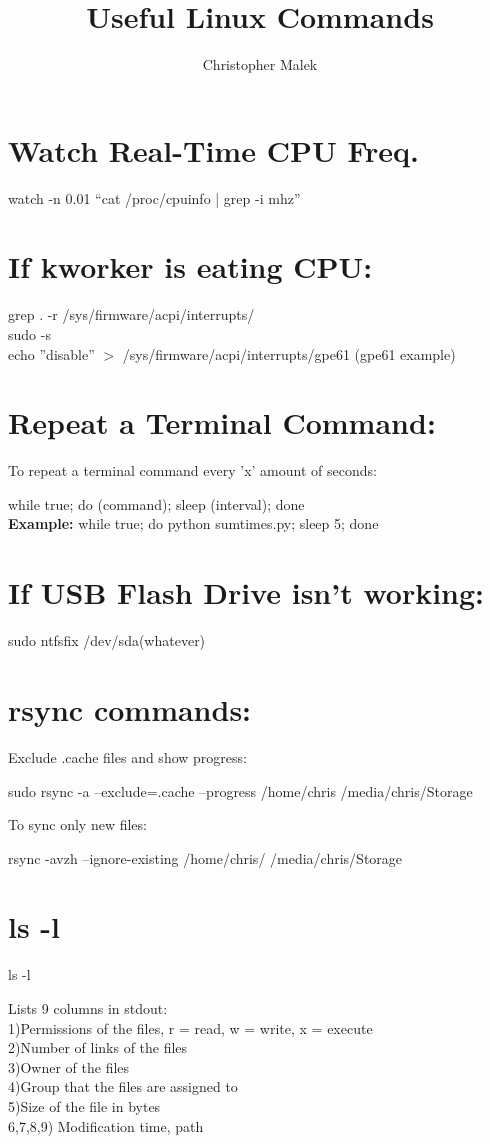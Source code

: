 \documentclass[10pt]{article}
\title{Useful Linux Commands}
\author{Christopher Malek}
\date{}
\newcommand{\bt}{\begin{tcolorbox}}
\newcommand{\et}{\end{tcolorbox}}
\begin{document}
\maketitle
\section{Watch Real-Time CPU Freq.}
\bt
watch -n 0.01 ``cat /proc/cpuinfo | grep -i mhz''
\et

\section{If kworker is eating CPU:}
\bt
grep . -r /sys/firmware/acpi/interrupts/\\
sudo -s\\
echo ''disable'' $>$ /sys/firmware/acpi/interrupts/gpe61 (gpe61 example)
\et

\section{Repeat a Terminal Command:}
To repeat a terminal command every 'x' amount of seconds:
\bt
while true; do (command); sleep (interval); done\\
\textbf{Example:} while true; do python sumtimes.py; sleep 5; done
\et

\section{If USB Flash Drive isn't working:}
\bt
sudo ntfsfix /dev/sda(whatever)
\et

\section{rsync commands:}
Exclude .cache files and show progress:
\bt
sudo rsync -a --exclude=.cache --progress /home/chris /media/chris/Storage
\et
\noindent To sync only new files:
\bt
rsync -avzh --ignore-existing /home/chris/ /media/chris/Storage
\et

\section{ls -l}
 \bt
   ls -l
 \et
\noindent Lists 9 columns in stdout:\\
1)Permissions of the files, r = read, w = write, x = execute\\
2)Number of links of the files\\
3)Owner of the files\\
4)Group that the files are assigned to\\
5)Size of the file in bytes\\
6,7,8,9) Modification time, path
\end{document}
